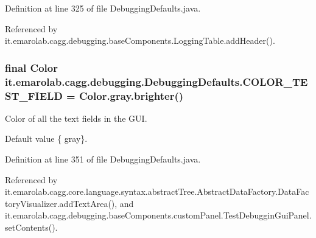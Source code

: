 Definition at line 325 of file Debugging\-Defaults.\-java.



Referenced by it.\-emarolab.\-cagg.\-debugging.\-base\-Components.\-Logging\-Table.\-add\-Header().

\hypertarget{classit_1_1emarolab_1_1cagg_1_1debugging_1_1DebuggingDefaults_a1b215a9bddc350c593a94a07c6796887}{
\subsubsection[{C\-O\-L\-O\-R\-\_\-\-T\-E\-S\-T\-\_\-\-F\-I\-E\-L\-D}]{\setlength{\rightskip}{0pt plus 5cm}final Color it.\-emarolab.\-cagg.\-debugging.\-Debugging\-Defaults.\-C\-O\-L\-O\-R\-\_\-\-T\-E\-S\-T\-\_\-\-F\-I\-E\-L\-D = Color.\-gray.\-brighter()\hspace{0.3cm}{\ttfamily [static]}}}\label{classit_1_1emarolab_1_1cagg_1_1debugging_1_1DebuggingDefaults_a1b215a9bddc350c593a94a07c6796887}
Color of all the text fields in the G\-U\-I. \par
 Default value \{ gray\}. 

Definition at line 351 of file Debugging\-Defaults.\-java.



Referenced by it.\-emarolab.\-cagg.\-core.\-language.\-syntax.\-abstract\-Tree.\-Abstract\-Data\-Factory.\-Data\-Factory\-Visualizer.\-add\-Text\-Area(), and it.\-emarolab.\-cagg.\-debugging.\-base\-Components.\-custom\-Panel.\-Test\-Debuggin\-Gui\-Panel.\-set\-Contents().

